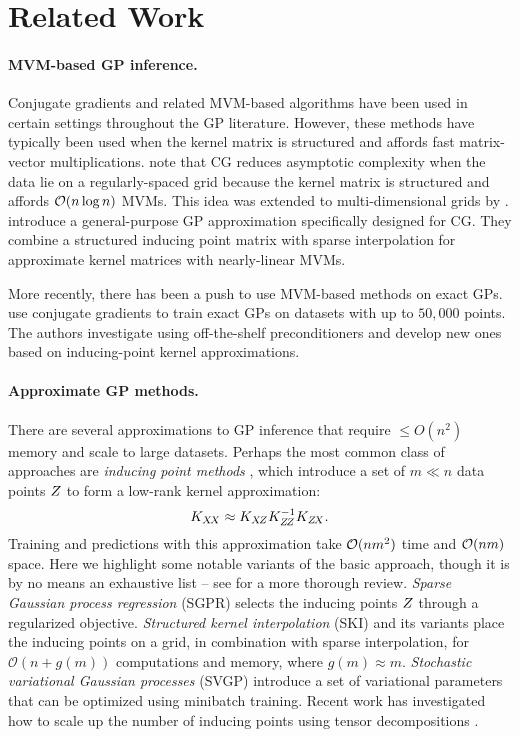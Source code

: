 \section{Related Work}

\paragraph{MVM-based GP inference.}
Conjugate gradients and related MVM-based algorithms \cite{gibbs1997efficient,ubaru2017fast,dong2017scalable} have been used in certain settings throughout the GP literature.
However, these methods have typically been used when the kernel matrix is structured and affords fast matrix-vector multiplications.
\citet{cunningham2008fast} note that CG reduces asymptotic complexity when the data lie on a regularly-spaced grid because the kernel matrix is structured and affords $\bigo{n \log n}$ MVMs.
This idea was extended to multi-dimensional grids by \citet{saatcci2012scalable}.
\citet{wilson2015kernel} introduce a general-purpose GP approximation specifically designed for CG.
They combine a structured inducing point matrix with sparse interpolation for approximate kernel matrices with nearly-linear MVMs.

More recently, there has been a push to use MVM-based methods on exact GPs.
\citet{cutajar2016preconditioning} use conjugate gradients to train exact GPs on datasets with up to $50,\!000$ points.
The authors investigate using off-the-shelf preconditioners and develop new ones based on inducing-point kernel approximations.

\paragraph{Approximate GP methods.}
There are several approximations to GP inference that require $\leq O(n^2)$ memory and scale to large datasets.
Perhaps the most common class of approaches are \emph{inducing point methods} \cite{quinonero2005unifying,snelson2006sparse}, which introduce a set of $m \ll n$ data points $Z$ to form a low-rank kernel approximation:
\[
  K_{X \! X} \approx K_{X \! Z} K_{Z \! Z}^{-1} K_{Z \! X}.
\]
Training and predictions with this approximation take $\bigo{n m^2}$ time and $\bigo{n m}$ space.
Here we highlight some notable variants of the basic approach, though it is by no means an exhaustive list -- see \cite{liu2018gaussian} for a more thorough review.
\emph{Sparse Gaussian process regression} (SGPR) \cite{titsias2009variational} selects the inducing points $Z$ through a regularized objective.
\emph{Structured kernel interpolation} (SKI) \cite{wilson2015kernel} and its variants \cite{gardner2018product} place the inducing points on a grid, in combination with sparse interpolation,
for $\mathcal{O}(n + g(m))$ computations and memory, where $g(m) \approx m$. \emph{Stochastic variational Gaussian processes} (SVGP) \cite{hensman2013gaussian} introduce a set of
variational parameters that can be optimized using minibatch training. Recent work has investigated how to scale up the number of inducing points using tensor decompositions \cite{evans2018scalable,izmailov2018scalable}.
